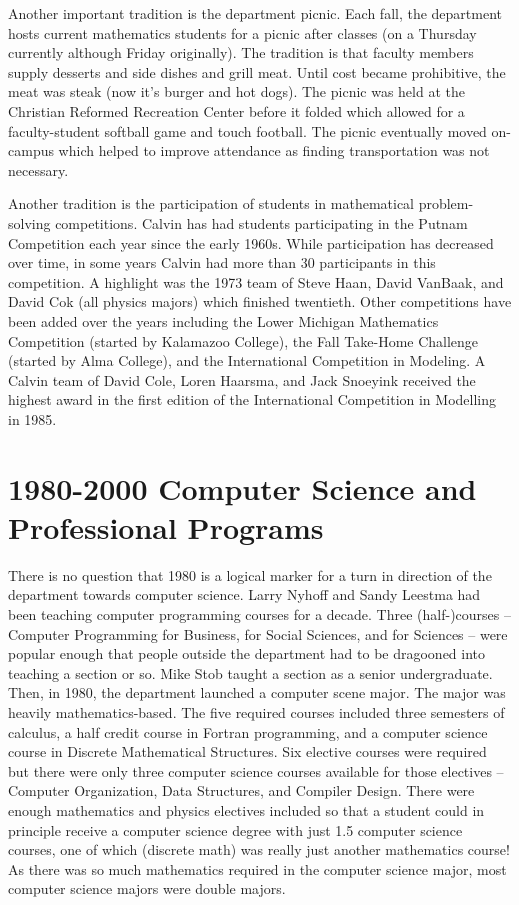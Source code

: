 \documentclass[
]{book}
\begin{document}
Another important tradition is the department picnic. Each fall, the department hosts current mathematics students for a picnic after classes (on a Thursday currently although Friday originally). The tradition is that faculty members supply desserts and side dishes and grill meat. Until cost became prohibitive, the meat was steak (now it's burger and hot dogs).
The picnic was held at the Christian Reformed Recreation Center before it folded which allowed for a faculty-student softball game and touch football. The picnic eventually moved on-campus which helped to improve attendance as finding transportation was not necessary.

Another tradition is the participation of students in mathematical problem-solving competitions. Calvin has had students participating in the Putnam Competition each year since the early 1960s. While participation has decreased over time, in some years Calvin had more than 30 participants in this competition. A highlight was the 1973 team of Steve Haan, David VanBaak, and David Cok (all physics majors) which finished twentieth. Other competitions have been added over the years including the Lower Michigan Mathematics Competition (started by Kalamazoo College), the Fall Take-Home Challenge (started by Alma College), and the International Competition in Modeling. A Calvin team of David Cole, Loren Haarsma, and Jack Snoeyink received the highest award in the first edition of the International Competition in Modelling in 1985.

\hypertarget{computer-science-and-professional-programs}{%
\chapter{1980-2000 Computer Science and Professional Programs}\label{computer-science-and-professional-programs}}

There is no question that 1980 is a logical marker for a turn in direction of the department towards computer science. Larry Nyhoff and Sandy Leestma had been teaching computer programming courses for a decade. Three (half-)courses -- Computer Programming for Business, for Social Sciences, and for Sciences -- were popular enough that people outside the department had to be dragooned into teaching a section or so. Mike Stob taught a section as a senior undergraduate. Then, in 1980, the department launched a computer scene major. The major was heavily mathematics-based. The five required courses included three semesters of calculus, a half credit course in Fortran programming, and a computer science course in Discrete Mathematical Structures. Six elective courses were required but there were only three computer science courses available for those electives -- Computer Organization, Data Structures, and Compiler Design. There were enough mathematics and physics electives included so that a student could in principle receive a computer science degree with just 1.5 computer science courses, one of which (discrete math) was really just another mathematics course! As there was so much mathematics required in the computer science major, most computer science majors were double majors.
\end{document}
